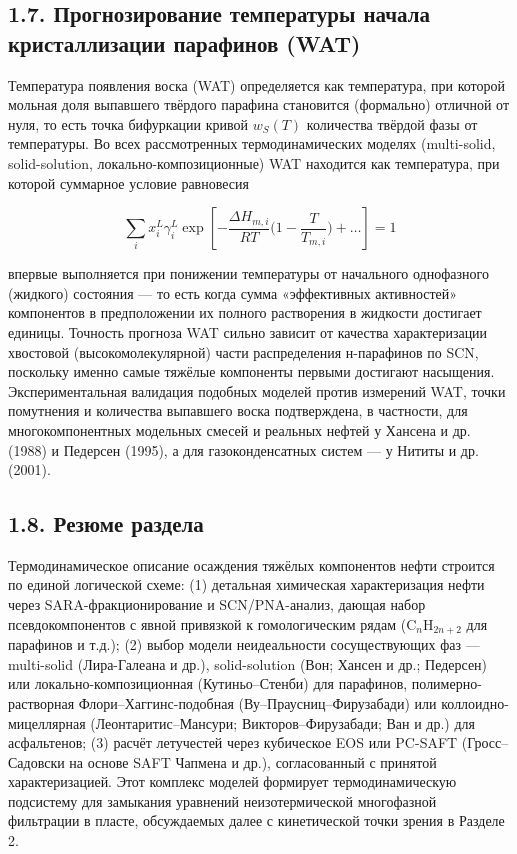 \documentclass[11pt]{extarticle}
\begin{document}
\subsection{1.7. Прогнозирование температуры начала кристаллизации парафинов (WAT)}\label{ux43fux440ux43eux433ux43dux43eux437ux438ux440ux43eux432ux430ux43dux438ux435-ux442ux435ux43cux43fux435ux440ux430ux442ux443ux440ux44b-ux43dux430ux447ux430ux43bux430-ux43aux440ux438ux441ux442ux430ux43bux43bux438ux437ux430ux446ux438ux438-ux43fux430ux440ux430ux444ux438ux43dux43eux432-wat}

Температура появления воска (WAT) определяется как температура, при которой мольная доля выпавшего твёрдого парафина становится (формально) отличной от нуля, то есть точка бифуркации кривой \(w_S(T)\) количества твёрдой фазы от температуры. Во всех рассмотренных термодинамических моделях (multi-solid, solid-solution, локально-композиционные) WAT находится как температура, при которой суммарное условие равновесия

\[
\sum_i x_i^L \gamma_i^L \exp\!\left[-\frac{\Delta H_{m,i}}{RT}\Big(1-\frac{T}{T_{m,i}}\Big)+\dots\right] = 1
\]

впервые выполняется при понижении температуры от начального однофазного (жидкого) состояния --- то есть когда сумма «эффективных активностей» компонентов в предположении их полного растворения в жидкости достигает единицы. Точность прогноза WAT сильно зависит от качества характеризации хвостовой (высокомолекулярной) части распределения н-парафинов по SCN, поскольку именно самые тяжёлые компоненты первыми достигают насыщения. Экспериментальная валидация подобных моделей против измерений WAT, точки помутнения и количества выпавшего воска подтверждена, в частности, для многокомпонентных модельных смесей и реальных нефтей у Хансена и др. (1988) и Педерсен (1995), а для газоконденсатных систем --- у Нититы и др. (2001).

\subsection{1.8. Резюме раздела}\label{ux440ux435ux437ux44eux43cux435-ux440ux430ux437ux434ux435ux43bux430}

Термодинамическое описание осаждения тяжёлых компонентов нефти строится по единой логической схеме: (1) детальная химическая характеризация нефти через SARA-фракционирование и SCN/PNA-анализ, дающая набор псевдокомпонентов с явной привязкой к гомологическим рядам (\(\mathrm{C}_n\mathrm{H}_{2n+2}\) для парафинов и т.д.); (2) выбор модели неидеальности сосуществующих фаз --- multi-solid (Лира-Галеана и др.), solid-solution (Вон; Хансен и др.; Педерсен) или локально-композиционная (Кутиньо--Стенби) для парафинов, полимерно-растворная Флори--Хаггинс-подобная (Ву--Праусниц--Фирузабади) или коллоидно-мицеллярная (Леонтаритис--Мансури; Викторов--Фирузабади; Ван и др.) для асфальтенов; (3) расчёт летучестей через кубическое EOS или PC-SAFT (Гросс--Садовски на основе SAFT Чапмена и др.), согласованный с принятой характеризацией. Этот комплекс моделей формирует термодинамическую подсистему для замыкания уравнений неизотермической многофазной фильтрации в пласте, обсуждаемых далее с кинетической точки зрения в Разделе 2.
\end{document}
